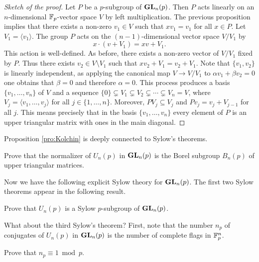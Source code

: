 \begin{proof}[Sketch of the proof]
    Let $P$ be a $p$-subgroup of $\mathbf{GL}_n(p)$. 
    Then $P$ acts linearly on an $n$-dimensional 
    $\mathbb{F}_p$-vector space $V$ by left multiplication. 
    The previous
    proposition implies that there exists a non-zero
    $v_1\in V$
    such that $xv_1=v_1$ for all $x\in P$. Let 
    $V_1=\langle v_1\rangle$. The group $P$ 
    acts on the $(n-1)$-dimensional vector space 
    $V/V_1$ by 
    \[
    x\cdot (v+V_1)=xv+V_1.
    \]
    This action is well-defined. 
    As before, there exists a non-zero 
    vector of $V/V_1$ fixed by $P$. Thus 
    there exists $v_2\in V\setminus V_1$ such that 
    $xv_2+V_1=v_2+V_1$. Note that $\{v_1,v_2\}$ is linearly
    independent, as applying the canonical
    map $V\to V/V_1$ to 
    $\alpha v_1+\beta v_2=0$ one obtains
    that $\beta=0$ and therefore $\alpha=0$. This process
    produces a basis $\{v_1,\dots,v_n\}$ 
    of $V$ and a sequence $\{0\}\subsetneq V_1\subsetneq V_2\subsetneq\cdots\subsetneq V_n=V$, where 
    $V_j=\langle v_1,\dots,v_j\rangle$ for all $j\in\{1,\dots,n\}$. Moreover,  
    $PV_j\subseteq V_j$  and 
    $Pv_j=v_j+V_{j-1}$ for all $j$. This
    means precisely that in the basis 
    $\{v_1,\dots,v_n\}$ 
    every element of $P$ is an upper triangular
    matrix with ones in the main diagonal. 
\end{proof}

Proposition \ref{pro:Kolchin} is deeply 
connected to Sylow's theorems. 

\begin{exercise}
    Prove that the normalizer of $U_n(p)$ in $\mathbf{GL}_n(p)$ is the
    Borel subgroup $B_n(p)$ of upper triangular matrices. 
\end{exercise}

Now we have the following explicit Sylow theory for
$\mathbf{GL}_n(p)$. The first two Sylow theorems 
appear in the following result. 

\begin{exercise}
    Prove that  $U_n(p)$ is a Sylow $p$-subgroup of $\mathbf{GL}_n(p)$. 
\end{exercise}

What about the third Sylow's theorem? 
First, note that the number $n_p$
of conjugates of $U_n(p)$ in $\mathbf{GL}_n(p)$ 
is the number of complete flags 
in $\mathbb{F}_p^n$.

\begin{exercise}
    Prove that $n_p\equiv1\bmod p$. 
\end{exercise}

